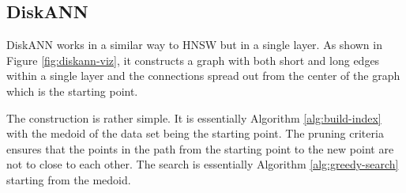
\subsection{DiskANN}

DiskANN works in a similar way to HNSW but in a single layer. As shown in Figure \ref{fig:diskann-viz}, it constructs a graph with both short and long edges within a single layer and the connections spread out from the center of the graph which is the starting point.

The construction is rather simple. It is essentially Algorithm \ref{alg:build-index} with the medoid of the data set being the starting point. The pruning criteria ensures that the points in the path from the starting point to the new point are not to close to each other. The search is essentially Algorithm \ref{alg:greedy-search} starting from the medoid.



